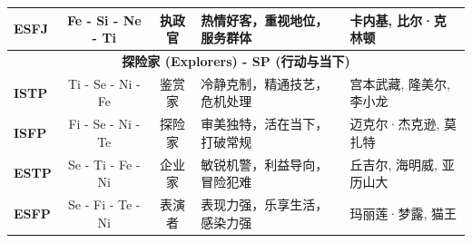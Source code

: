 \documentclass[UTF8,letter,10pt]{ctexart}
\begin{document}
\begin{table}[h!]
{\begin{tabular}{@{}l c c l l@{}}
\textbf{ESFJ} & Fe - Si - Ne - Ti & 执政官 & 热情好客，重视地位，服务群体 & 卡内基, 比尔·克林顿 \\
\midrule
\multicolumn{5}{c}{\textbf{探险家 (Explorers) - SP (行动与当下)}} \\
\midrule
\textbf{ISTP} & Ti - Se - Ni - Fe & 鉴赏家 & 冷静克制，精通技艺，危机处理 & 宫本武藏, 隆美尔, 李小龙 \\
\textbf{ISFP} & Fi - Se - Ni - Te & 探险家 & 审美独特，活在当下，打破常规 & 迈克尔·杰克逊, 莫扎特 \\
\textbf{ESTP} & Se - Ti - Fe - Ni & 企业家 & 敏锐机警，利益导向，冒险犯难 & 丘吉尔, 海明威, 亚历山大 \\
\textbf{ESFP} & Se - Fi - Te - Ni & 表演者 & 表现力强，乐享生活，感染力强 & 玛丽莲·梦露, 猫王 \\
\bottomrule
\end{tabular}}

\end{table}
\end{document}
